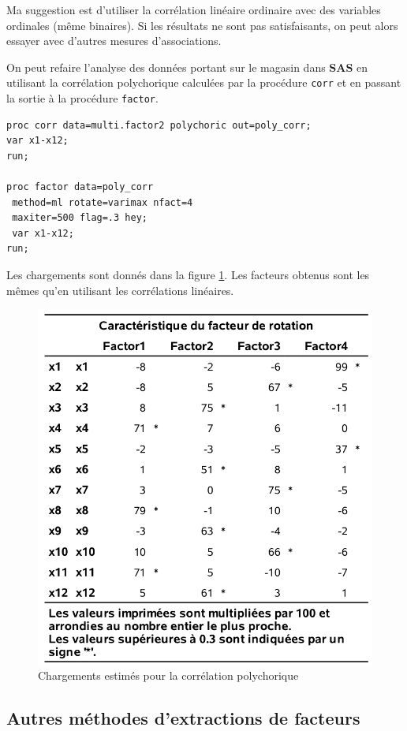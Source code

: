 \documentclass[
  11pt,
  letterpaper,
]{book}
\theoremstyle{definition}
\theoremstyle{definition}
\theoremstyle{definition}
\theoremstyle{remark}
\begin{document}
Ma suggestion est d'utiliser la corrélation linéaire ordinaire avec des variables ordinales (même binaires). Si les résultats ne sont pas satisfaisants, on peut alors essayer avec d'autres mesures d'associations.

On peut refaire l'analyse des données portant sur le magasin dans \textbf{SAS} en utilisant la corrélation polychorique calculées par la procédure \texttt{corr} et en passant la sortie à la procédure \texttt{factor}.

\begin{verbatim}
proc corr data=multi.factor2 polychoric out=poly_corr;
var x1-x12;
run;

proc factor data=poly_corr
 method=ml rotate=varimax nfact=4
 maxiter=500 flag=.3 hey;
 var x1-x12;
run;
\end{verbatim}

Les chargements sont donnés dans la figure \ref{fig:fig1p12}. Les facteurs obtenus sont les mêmes qu'en utilisant les corrélations linéaires.

\begin{figure}

{\centering \includegraphics[width=0.65\linewidth]{figures/01-facto-e12} 

}

\caption{Chargements estimés pour la corrélation polychorique}\label{fig:fig1p12}
\end{figure}

\hypertarget{autres-muxe9thodes-dextractions-de-facteurs}{%
\subsection{Autres méthodes d'extractions de facteurs}\label{autres-muxe9thodes-dextractions-de-facteurs}}
\end{document}
